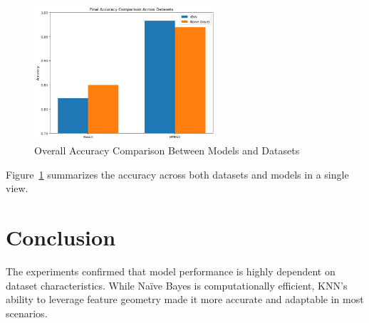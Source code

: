 \begin{figure}[H]
    \centering
    \includegraphics[width=0.6\textwidth]{figures/final_model_comparison.png}
    \caption{Overall Accuracy Comparison Between Models and Datasets}
    \label{fig:final_model_chart}
\end{figure}

Figure~\ref{fig:final_model_chart} summarizes the accuracy across both datasets and models in a single view.

\section{Conclusion}

The experiments confirmed that model performance is highly dependent on dataset characteristics. While Naïve Bayes is computationally efficient, KNN’s ability to leverage feature geometry made it more accurate and adaptable in most scenarios.
